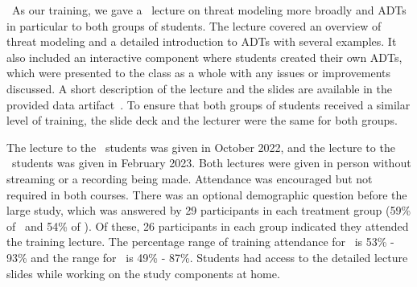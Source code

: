 \ As our training, we gave a \ lecture on threat modeling more broadly and ADTs in particular to both groups of students. The lecture covered an overview of threat modeling and a detailed introduction to ADTs with several examples. It also included an interactive component where students created their own ADTs, which were presented to the class as a whole with any issues or improvements discussed. A short description of the lecture and the slides are available in the provided data artifact~\cite{zenodo-dataset}. To ensure that both groups of students received a similar level of training, the slide deck and the lecturer were the same for both groups. 

The lecture to the \ICS\ students was given in October 2022, and the lecture to the \SEC\ students was given in February 2023. Both lectures were given in person without streaming or a recording being made. Attendance was encouraged but not required in both courses. There was an optional demographic question before the large study, which was answered by 29 participants in each treatment group (59\% of \ICS\ and 54\% of \SEC). Of these, 26 participants in each group indicated they attended the training lecture. The percentage range of training attendance for \ICS\ is 53\% - 93\% and the range for \SEC\ is 49\% - 87\%. Students had access to the detailed lecture slides while working on the study components at home. 
